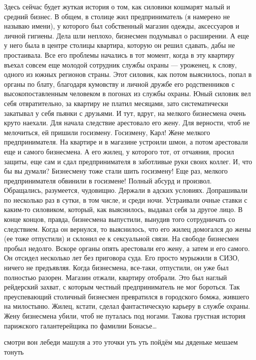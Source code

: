 Здесь сейчас будет жуткая история о том, как силовики кошмарят малый и средний бизнес.
В общем, в столице жил предприниматель (я намерено не называю имени), у которого был собственный магазин одежды, аксессуаров и личной гигиены. Дела шли неплохо, бизнесмен подумывал о расширении. А еще у него была в центре столицы квартира, которую он решил сдавать, дабы не простаивала. Все его проблемы начались в тот момент, когда в эту квартиру въехал совсем еще молодой сотрудник службы охраны — уроженец, к слову, одного из южных регионов страны. Этот силовик, как потом выяснилось, попал в органы по блату, благодаря кумовству и личной дружбе его родственников с высокопоставленным человеком в погонах из службы охраны.
Юный силовик вел себя отвратительно, за квартиру не платил месяцами, зато систематически закатывал у себя пьянки с друзьями. И тут, вдруг, на мелкого бизнесмена очень круто наехали. Для начала следствие арестовало его жену. Для верности, чтоб не мелочиться, ей пришили госизмену. Госизмену, Карл! Жене мелкого предпринимателя. На квартире и в магазине устроили шмон, а потом арестовали еще и самого бизнесмена. А его жилец, у которого тот, от отчаяния, просил защиты, еще сам и сдал предпринимателя в заботливые руки своих коллег.
И, что бы вы думали? Бизнесмену тоже стали шить госизмену! Еще раз, мелкого предпринимателя обвинили в госизмене! Полный абсурд и произвол. Обращались, разумеется, чудовищно. Держали в адских условиях. Допрашивали по несколько раз в сутки, в том числе, и среди ночи. Устраивали очные ставки с каким-то силовиком, который, как выяснилось, выдавал себя за другое лицо.
В конце концов, правда, бизнесмена выпустили, вынудив того сотрудничать со следствием. Когда он вернулся, то выяснилось, что его жилец домогался до жены (ее тоже отпустили) и склонил ее к сексуальной связи. На свободе бизнесмен пробыл недолго. Вскоре органы опять арестовали его жену, а затем и его самого.
Он отсидел несколько лет без приговора суда. Его просто мурыжили в СИЗО, ничего не предъявляя. Когда бизнесмена, все-таки, отпустили, он уже был полностью разорен. Магазин отжали, квартиру отобрали. Это был наглый рейдерский захват, с которым честный предприниматель не мог бороться.
Так преуспевающий столичный бизнесмен превратился в городского бомжа, жившего на милостыню.
Жилец, кстати, сделал фантастическую карьеру в службе охраны. Жену бизнесмена убили, чтоб не путалась под ногами.
Такова грустная история парижского галантерейщика по фамилии Бонасье…

смотри вон лебеди машуля
а это уточки уть уть
пойдём мы дяденьке мешаем
тонуть

